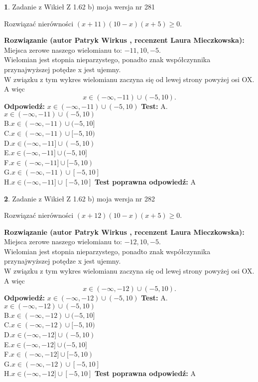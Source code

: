 \documentclass[12pt, a4paper]{article}
\theoremstyle{definition} %
\newtheorem{zad}{}
\newcommand{\zadStart}[1]{\begin{zad}#1\newline}
\newcommand{\zadStop}{\end{zad}}
\newcommand{\rozwStart}[2]{\noindent \textbf{Rozwiązanie (autor #1 , recenzent #2): }\newline}
\newcommand{\rozwStop}{\newline}
\newcommand{\odpStart}{\noindent \textbf{Odpowiedź:}\newline}
\newcommand{\odpStop}{\newline}
\newcommand{\testStart}{\noindent \textbf{Test:}\newline}
\newcommand{\testStop}{\newline}
\newcommand{\kluczStart}{\noindent \textbf{Test poprawna odpowiedź:}\newline}
\newcommand{\kluczStop}{\newline}
\begin{document}
\zadStart{Zadanie z Wikieł Z 1.62 b) moja wersja nr 281}

Rozwiązać nierówności $(x+11)(10-x)(x+5)\ge0$.
\zadStop
\rozwStart{Patryk Wirkus}{Laura Mieczkowska}
Miejsca zerowe naszego wielomianu to: $-11, 10, -5$.\\
Wielomian jest stopnia nieparzystego, ponadto znak współczynnika przy\linebreak najwyższej potędze x jest ujemny.\\ W związku z tym wykres wielomianu zaczyna się od lewej strony powyżej osi OX. A więc $$x \in (-\infty,-11) \cup (-5,10).$$
\rozwStop
\odpStart
$x \in (-\infty,-11) \cup (-5,10)$
\odpStop
\testStart
A.$x \in (-\infty,-11) \cup (-5,10)$\\
B.$x \in (-\infty,-11) \cup (-5,10]$\\
C.$x \in (-\infty,-11) \cup [-5,10)$\\
D.$x \in (-\infty,-11] \cup (-5,10)$\\
E.$x \in (-\infty,-11] \cup (-5,10]$\\
F.$x \in (-\infty,-11] \cup [-5,10)$\\
G.$x \in (-\infty,-11) \cup [-5,10]$\\
H.$x \in (-\infty,-11] \cup [-5,10]$
\testStop
\kluczStart
A
\kluczStop



\zadStart{Zadanie z Wikieł Z 1.62 b) moja wersja nr 282}

Rozwiązać nierówności $(x+12)(10-x)(x+5)\ge0$.
\zadStop
\rozwStart{Patryk Wirkus}{Laura Mieczkowska}
Miejsca zerowe naszego wielomianu to: $-12, 10, -5$.\\
Wielomian jest stopnia nieparzystego, ponadto znak współczynnika przy\linebreak najwyższej potędze x jest ujemny.\\ W związku z tym wykres wielomianu zaczyna się od lewej strony powyżej osi OX. A więc $$x \in (-\infty,-12) \cup (-5,10).$$
\rozwStop
\odpStart
$x \in (-\infty,-12) \cup (-5,10)$
\odpStop
\testStart
A.$x \in (-\infty,-12) \cup (-5,10)$\\
B.$x \in (-\infty,-12) \cup (-5,10]$\\
C.$x \in (-\infty,-12) \cup [-5,10)$\\
D.$x \in (-\infty,-12] \cup (-5,10)$\\
E.$x \in (-\infty,-12] \cup (-5,10]$\\
F.$x \in (-\infty,-12] \cup [-5,10)$\\
G.$x \in (-\infty,-12) \cup [-5,10]$\\
H.$x \in (-\infty,-12] \cup [-5,10]$
\testStop
\kluczStart
A
\kluczStop
\end{document}
